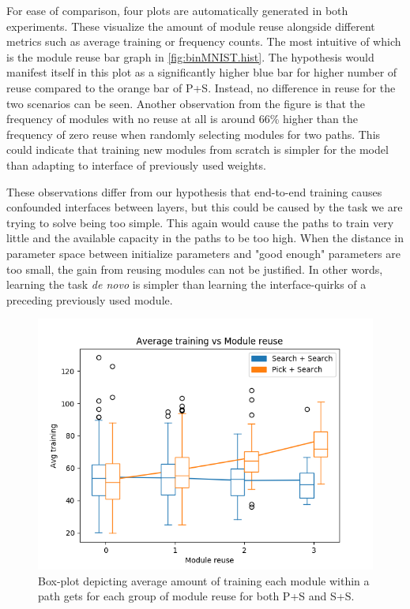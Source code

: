 For ease of comparison, four plots are automatically generated in both experiments. These visualize the amount of module reuse alongside different metrics such as average training or frequency counts. 
The most intuitive of which is the module reuse bar graph in \ref{fig:binMNIST.hist}. The hypothesis would manifest itself in this plot as a significantly higher blue bar for higher number of reuse compared to the orange bar of P+S. Instead, no difference in reuse for the two scenarios can be seen. Another observation from the figure is that the frequency of modules with no reuse at all is around 66\% higher than the frequency of zero reuse when randomly selecting modules for two paths. This could indicate that training new modules from scratch is simpler for the model than adapting to interface of previously used weights.

These observations differ from our hypothesis that end-to-end training causes confounded interfaces between layers, but this could be caused by the task we are trying to solve being too simple. This again would cause the paths to train very little and the available capacity in the paths to be too high. When the distance in parameter space between initialize parameters and "good enough" parameters are too small, the gain from reusing modules can not be justified. In other words, learning the task \textit{de novo} is simpler than learning the interface-quirks of a preceding previously used module.

\begin{figure}[t]
    \includegraphics[width=\textwidth]{Chapters/Experiments/first_path/figures/600binMNIST_training_boxplot.png}
    \caption{Box-plot depicting average amount of training each module within a path gets for each group of module reuse for both P+S and S+S. }
    \label{fig:binMNIST.box}
\end{figure}

